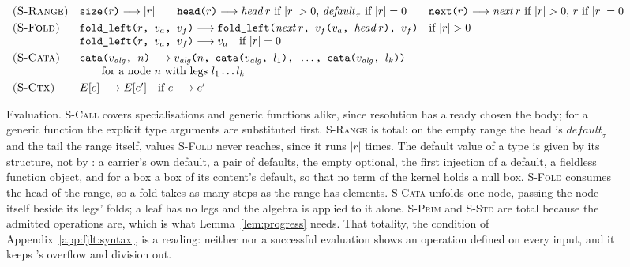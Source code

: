 \begin{figure}[htbp]
\[\begin{array}{ll}
\textsc{(S-Range)} & \texttt{size(}r\texttt{)} \longrightarrow |r| \qquad \texttt{head(}r\texttt{)} \longrightarrow \mathit{head}\,r \text{ if } |r| > 0 \text{, } \mathit{default}_\tau \text{ if } |r| = 0 \qquad \texttt{next(}r\texttt{)} \longrightarrow \mathit{next}\,r \text{ if } |r| > 0 \text{, } r \text{ if } |r| = 0 \\[3pt]
\textsc{(S-Fold)} & \texttt{fold\_left(}r\texttt{, }v_a\texttt{, }v_f\texttt{)} \longrightarrow \texttt{fold\_left(}\mathit{next}\,r\texttt{, }v_f\texttt{(}v_a\texttt{, }\mathit{head}\,r\texttt{), }v_f\texttt{)} \quad \text{if } |r| > 0 \\
 & \texttt{fold\_left(}r\texttt{, }v_a\texttt{, }v_f\texttt{)} \longrightarrow v_a \quad \text{if } |r| = 0 \\[3pt]
\textsc{(S-Cata)} & \texttt{cata(}v_{\mathit{alg}}\texttt{, }n\texttt{)} \longrightarrow v_{\mathit{alg}}\texttt{(}n\texttt{, cata(}v_{\mathit{alg}}\texttt{, }l_1\texttt{), }\ldots\texttt{, cata(}v_{\mathit{alg}}\texttt{, }l_k\texttt{))} \\
 & \qquad \text{for a node } n \text{ with legs } l_1 \ldots l_k \\[3pt]
\textsc{(S-Ctx)} & E[e] \longrightarrow E[e'] \quad \text{if } e \longrightarrow e' \\
\end{array}
\]
\normalsize
\caption{Evaluation.
\textsc{S-Call} covers specialisations and generic functions alike, since resolution has already chosen the body; for a generic function the explicit type arguments are substituted first.
\textsc{S-Range} is total: on the empty range the head is $\mathit{default}_\tau$ and the tail the range itself, values \textsc{S-Fold} never reaches, since it runs $|r|$ times.
The default value of a type is given by its structure, not by : a carrier's own default, a pair of defaults, the empty optional, the first injection of a default, a fieldless function object, and for a box a box of its content's default, so that no term of the kernel holds a null box.
\textsc{S-Fold} consumes the head of the range, so a fold takes as many steps as the range has elements.
\textsc{S-Cata} unfolds one node, passing the node itself beside its legs' folds; a leaf has no legs and the algebra is applied to it alone.
\textsc{S-Prim} and \textsc{S-Std} are total because the admitted operations are, which is what Lemma~\ref{lem:progress} needs.
That totality, the condition of Appendix~\ref{app:fjlt:syntax}, is a reading: neither  nor a successful evaluation shows an operation defined on every input, and it keeps 's overflow and division out.
}
\end{figure}
